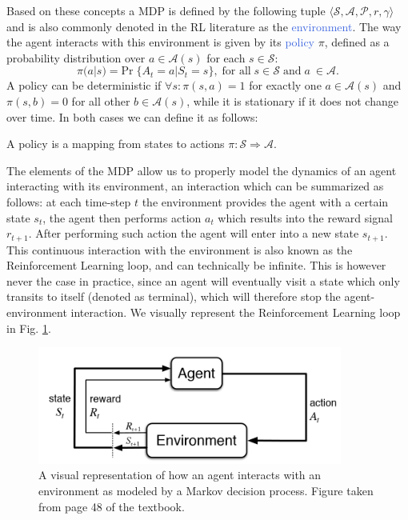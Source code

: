 Based on these concepts a MDP is defined by the following tuple $\langle\mathcal{S}, \mathcal{A}, \mathcal{P}, r, \gamma\rangle$ and is also commonly denoted in the RL literature as the \textcolor{RoyalBlue}{environment}. The way the agent interacts with this environment is given by its \textcolor{RoyalBlue}{policy} $\pi$, defined as a probability distribution over $a \in \mathcal{A}(s)$ for each $s \in \mathcal{S}$:
\begin{equation}
	\pi(a|s) = \text{Pr}\; \{A_t = a | S_t = s\}, \; \text{for all}\; s \in \mathcal{S}\; \text{and}\; a\ \in \mathcal{A}. 
\end{equation}
A policy can be deterministic if $\forall s:\pi(s,a) = 1$ for exactly one $a \in \mathcal{A}(s)$ and $\pi(s,b)=0$ for all other $b \in \mathcal{A}(s)$, while it is stationary if it does not change over time. In both cases 
we can define it as follows:
\begin{definition}
	A policy is a mapping from states to actions $\pi:\mathcal{S}\Rightarrow\mathcal{A}$. 
\end{definition}
The elements of the MDP allow us to properly model the dynamics of an agent interacting with its environment, an interaction which can be summarized as follows: at each time-step $t$ the environment provides the agent with a certain state $s_t$, the agent then performs action $a_t$ which results into the reward signal $r_{t+1}$. After performing such action the agent will enter into a new state $s_{t+1}$. This continuous interaction with the environment is also known as the Reinforcement Learning loop, and can technically be infinite. This is however never the case in practice, since an agent will eventually visit a state which only transits to itself (denoted as terminal), which will therefore stop the agent-environment interaction. We visually represent the Reinforcement Learning loop in Fig. \ref{fig:rl_loop}.

\begin{figure}[ht!]
\centering
  \includegraphics[width=10cm]{./Images/Chapter06/rl_loop.png}
  \caption{A visual representation of how an agent interacts with an environment as modeled by a Markov decision process. Figure taken from page 48 of the \citet{sutton2018reinforcement} textbook.}
  \label{fig:rl_loop}
\end{figure}

